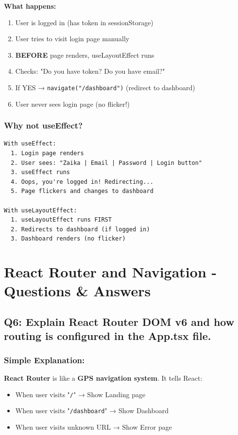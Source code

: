 \documentclass[12pt]{article}
\begin{document}
\textbf{What happens:}

\begin{enumerate}
    \item User is logged in (has token in sessionStorage)
    \item User tries to visit login page manually
    \item \textbf{BEFORE} page renders, useLayoutEffect runs
    \item Checks: "Do you have token? Do you have email?"
    \item If YES → \texttt{navigate("/dashboard")} (redirect to dashboard)
    \item User never sees login page (no flicker!)
\end{enumerate}

\subsubsection*{Why not useEffect?}

\begin{lstlisting}
With useEffect:
  1. Login page renders
  2. User sees: "Zaika | Email | Password | Login button"
  3. useEffect runs
  4. Oops, you're logged in! Redirecting...
  5. Page flickers and changes to dashboard
  
With useLayoutEffect:
  1. useLayoutEffect runs FIRST
  2. Redirects to dashboard (if logged in)
  3. Dashboard renders (no flicker)
\end{lstlisting}

\section{React Router and Navigation - Questions \& Answers}

\subsection{Q6: Explain React Router DOM v6 and how routing is configured in the App.tsx file.}

\subsubsection*{Simple Explanation:}

\textbf{React Router} is like a \textbf{GPS navigation system}. It tells React:
\begin{itemize}
    \item When user visits "\texttt{/}" → Show Landing page
    \item When user visits "\texttt{/dashboard}" → Show Dashboard
    \item When user visits unknown URL → Show Error page
\end{itemize}
\end{document}
